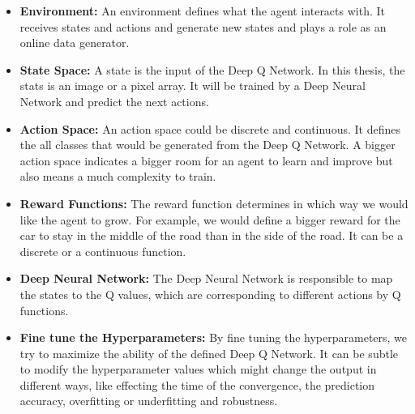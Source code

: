 \begin{itemize}
	
    \item \textbf{Environment:} An environment defines what the agent interacts with. It receives states and actions and generate new states and plays a role as an online data generator. 
    \item \textbf{State Space:} A state is the input of the Deep Q Network. In this thesis, the stats is an image or a pixel array. It will be trained by a Deep Neural Network and predict the next actions.
    \item \textbf{Action Space:} An action space could be discrete and continuous. It defines the all classes that would be generated from the Deep Q Network. A bigger action space indicates a bigger room for an agent to learn and improve but also means a much complexity to train.
    \item \textbf{Reward Functions:} The reward function determines in which way we would like the agent to grow. For example, we would define a bigger reward for the car to stay in the middle of the road than in the side of the road. It can be a discrete or a continuous function.
    \item \textbf{Deep Neural Network:} The Deep Neural Network is responsible to map the states to the Q values, which are corresponding to different actions by Q functions. 
    \item \textbf{Fine tune the Hyperparameters:} By fine tuning the hyperparameters, we try to maximize the ability of the defined Deep Q Network. It can be subtle to modify the hyperparameter values which might change the output in different ways, like effecting the time of the convergence, the prediction accuracy, overfitting or underfitting and robustness.
    
\end{itemize}






